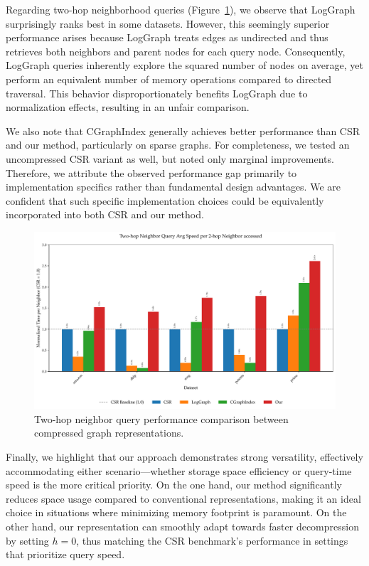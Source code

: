Regarding two-hop neighborhood queries (Figure~\ref{fig:two_hop_queries}), we observe that LogGraph surprisingly ranks best in some datasets. However, this seemingly superior performance arises because LogGraph treats edges as undirected and thus retrieves both neighbors and parent nodes for each query node. Consequently, LogGraph queries inherently explore the squared number of nodes on average, yet perform an equivalent number of memory operations compared to directed traversal. This behavior disproportionately benefits LogGraph due to normalization effects, resulting in an unfair comparison.

We also note that CGraphIndex generally achieves better performance than CSR and our method, particularly on sparse graphs. For completeness, we tested an uncompressed CSR variant as well, but noted only marginal improvements. Therefore, we attribute the observed performance gap primarily to implementation specifics rather than fundamental design advantages. We are confident that such specific implementation choices could be equivalently incorporated into both CSR and our method.

\begin{figure}[htbp]
  \centering
  \includegraphics[width=\linewidth]{plots/adj_2neighbors_comparison.pdf}
  \caption{Two-hop neighbor query performance comparison between compressed graph representations.}
  \label{fig:two_hop_queries}
\end{figure}
\FloatBarrier

Finally, we highlight that our approach demonstrates strong versatility, effectively accommodating either scenario—whether storage space efficiency or query-time speed is the more critical priority. On the one hand, our method significantly reduces space usage compared to conventional representations, making it an ideal choice in situations where minimizing memory footprint is paramount. On the other hand, our representation can smoothly adapt towards faster decompression by setting \( h=0 \), thus matching the CSR benchmark's performance in settings that prioritize query speed.

